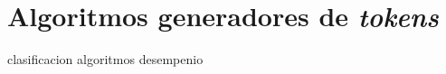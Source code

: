 %
%
%

\section{Algoritmos generadores de \textit{tokens}}

{clasificacion}
{algoritmos}
{desempenio}
